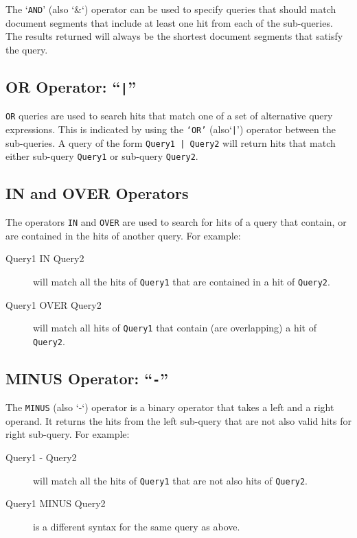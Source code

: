 The `{\tt AND}' (also `\&`) operator can be used to specify queries that should
match document segments that include at least one hit from each of the
sub-queries. The results returned will always be the shortest document segments
that satisfy the query.

\subsection{OR Operator: ``{\tt |}''}\label{sec:or-query}

{\tt OR} queries are used to search hits that match one of a set of alternative
query expressions. This is indicated by using the {\tt `OR'} (also`\verb!|!')
operator between the sub-queries. A query of the form {\tt Query1 | Query2} will
return hits that match either sub-query {\tt Query1} or sub-query {\tt Query2}.

\subsection{IN and OVER Operators}\label{sec:containment-query}

The operators {\tt IN} and {\tt OVER} are used to search for hits of a query
that contain, or are contained in the hits of another query. For example:
\begin{description}
\item[Query1 IN Query2] will match all the hits of {\tt Query1} that are
contained in a hit of {\tt Query2}.
\item[Query1 OVER Query2] will match all hits of {\tt Query1} that contain (are
overlapping) a hit of {\tt Query2}.
\end{description}

\subsection{MINUS Operator: ``{\tt -}''}\label{sec:minus-query}

The {\tt MINUS} (also `-`) operator is a binary operator that takes a left and
a right operand. It returns the hits from the left sub-query that are not also
valid hits for right sub-query. For example:
\begin{description}
\item[Query1 - Query2] will match all the hits of {\tt Query1} that are
not also hits of {\tt Query2}.
\item[Query1 MINUS Query2] is a different syntax for the same query as above.
\end{description}

